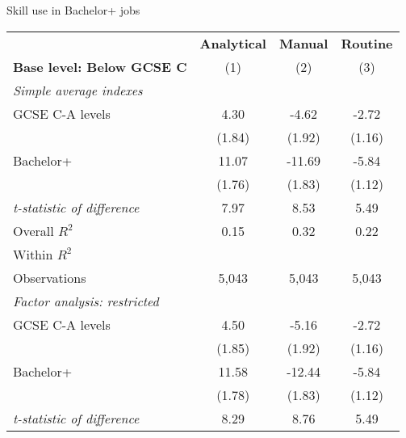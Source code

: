 \begin{center}
\begin{threeparttable}[!h]
\caption{Skill use in Bachelor+ jobs}
\label{tab:skillRegs}
\begin{tabular}{lccc}
\toprule
\toprule
&\multicolumn{1}{c}{\textbf{Analytical}}&\multicolumn{1}{c}{\textbf{Manual}}&\multicolumn{1}{c}{\textbf{Routine}} \\
\textbf{Base level: Below GCSE C}&\multicolumn{1}{c}{(1)}&\multicolumn{1}{c}{(2)}&\multicolumn{1}{c}{(3)} \\
\midrule
\textit{Simple average indexes}\vspace{1mm} \\ 
\hspace{3mm}GCSE C-A levels&        4.30\sym{*}  &       -4.62\sym{*}  &       -2.72\sym{*}  \\
                    &      (1.84)         &      (1.92)         &      (1.16)         \\
\hspace{3mm}Bachelor+&       11.07\sym{***}&      -11.69\sym{***}&       -5.84\sym{***}\\
                    &      (1.76)         &      (1.83)         &      (1.12)         \\
\textit{t-statistic of difference}&        7.97         &        8.53         &        5.49         \\
\midrule Overall $ R^2$&        0.15         &        0.32         &        0.22         \\
Within $ R^2$       &                     &                     &                     \\
Observations        &       5,043         &       5,043         &       5,043         \\
\midrule \vspace{1mm}\textit{Factor analysis: restricted} \\ 
\hspace{3mm}GCSE C-A levels&        4.50\sym{*}  &       -5.16\sym{**} &       -2.72\sym{*}  \\
                    &      (1.85)         &      (1.92)         &      (1.16)         \\
\hspace{3mm}Bachelor+&       11.58\sym{***}&      -12.44\sym{***}&       -5.84\sym{***}\\
                    &      (1.78)         &      (1.83)         &      (1.12)         \\
\textit{t-statistic of difference}&        8.29         &        8.76         &        5.49         \\

\end{tabular}
\end{threeparttable}
\end{center}
